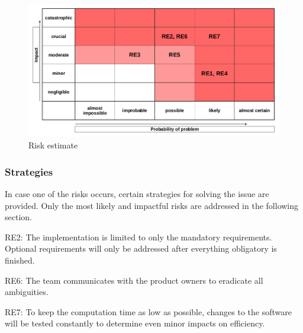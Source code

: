 \begin{figure}[h]
	\begin{center}
		\includegraphics[width= 15cm]{figures/risikoabschaetzung.png}
		\caption{Risk estimate}
	\end{center}
\end{figure}

\subsubsection{Strategies}

In case one of the risks occurs, certain strategies for solving the issue are provided. Only the most likely and impactful risks are addressed in the following section. 

\begin{aims}
	
	\item[RE2:]The implementation is limited to only the mandatory requirements. Optional requirements will only be 						   addressed after everything obligatory is finished.
	\item[RE6:]The team communicates with the product owners to eradicate all ambiguities.
	\item[RE7:]To keep the computation time as low as possible, changes to the software will be tested constantly to 						   determine even minor impacts on efficiency. 	
	
\end{aims}

\clearpage

